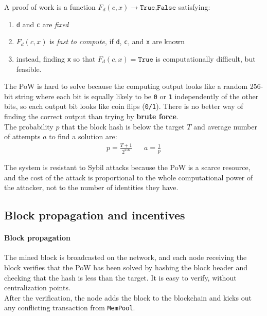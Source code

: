 \begin{definition}
   A proof of work is a function $F_d(c,x) \rightarrow {\texttt{True,False}}$ satisfying:
   \begin{enumerate}
      \item \texttt{d} and \texttt{c} are \textit{fixed}
      \item $F_d(c,x)$ is \textit{fast to compute}, if \texttt{d}, \texttt{c}, and \texttt{x} are known
      \item instead, finding \texttt{x} so that $F_d(c,x) = \texttt{True}$ is computationally difficult, but feasible.
   \end{enumerate}
\end{definition}

The PoW is hard to solve because the computing output looks like a random 256-bit string where each bit is equally likely to be \texttt{0} or \texttt{1} independently of the other bits, so each output bit looks like coin flips (\texttt{0/1}).
There is no better way of finding the correct output than trying by \textbf{brute force}.\\
The probability $p$ that the block hash is below the target $T$ and average number of attempts $a$ to find a solution are:
\begin{align*}
   p=\frac{T+1}{2^{256}} & & a=\frac{1}{p}
\end{align*}

The system is resistant to Sybil attacks because the PoW is a scarce resource, and the cost of the attack is proportional to the whole computational power of the attacker, not to the number of identities they have.


\subsection{Block propagation and incentives}
\paragraph*{Block propagation}
The mined block is broadcasted on the network, and each node receiving the block verifies that the PoW has been solved by hashing the block header and checking that the hash is less than the target.
It is easy to verify, without centralization points.\\
After the verification, the node adds the block to the blockchain and kicks out any conflicting transaction from \texttt{MemPool}.

